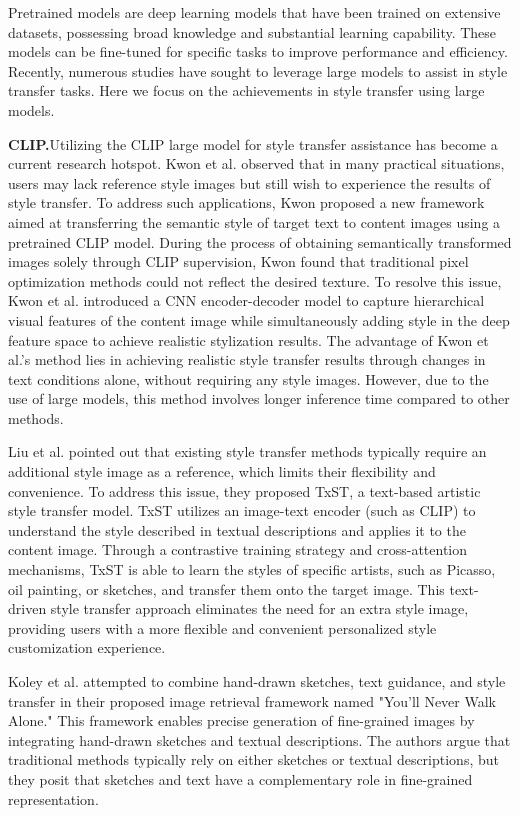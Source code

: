 \documentclass[preprint,12pt]{elsarticle}
\begin{document}
Pretrained models are deep learning models that have been trained on extensive datasets, possessing broad knowledge and substantial learning capability. These models can be fine-tuned for specific tasks to improve performance and efficiency. Recently, numerous studies have sought to leverage large models to assist in style transfer tasks. Here we focus on the achievements in style transfer using large models.

\textbf{CLIP.}\quad Utilizing the CLIP\citep{56radford2021learning} large model for style transfer assistance has become a current research hotspot. Kwon et al.\citep{57kwon2022clipstyler} observed that in many practical situations, users may lack reference style images but still wish to experience the results of style transfer. To address such applications, Kwon proposed a new framework aimed at transferring the semantic style of target text to content images using a pretrained CLIP model. During the process of obtaining semantically transformed images solely through CLIP supervision, Kwon found that traditional pixel optimization methods could not reflect the desired texture. To resolve this issue, Kwon et al. introduced a CNN encoder-decoder model to capture hierarchical visual features of the content image while simultaneously adding style in the deep feature space to achieve realistic stylization results. The advantage of Kwon et al.'s method lies in achieving realistic style transfer results through changes in text conditions alone, without requiring any style images. However, due to the use of large models, this method involves longer inference time compared to other methods.

Liu et al.\citep{113liu2023name} pointed out that existing style transfer methods typically require an additional style image as a reference, which limits their flexibility and convenience. To address this issue, they proposed TxST, a text-based artistic style transfer model. TxST utilizes an image-text encoder (such as CLIP) to understand the style described in textual descriptions and applies it to the content image. Through a contrastive training strategy and cross-attention mechanisms, TxST is able to learn the styles of specific artists, such as Picasso, oil painting, or sketches, and transfer them onto the target image. This text-driven style transfer approach eliminates the need for an extra style image, providing users with a more flexible and convenient personalized style customization experience.

Koley et al.\citep{106koley2024you} attempted to combine hand-drawn sketches, text guidance, and style transfer in their proposed image retrieval framework named "You’ll Never Walk Alone." This framework enables precise generation of fine-grained images by integrating hand-drawn sketches and textual descriptions. The authors argue that traditional methods typically rely on either sketches or textual descriptions, but they posit that sketches and text have a complementary role in fine-grained representation.
\end{document}
